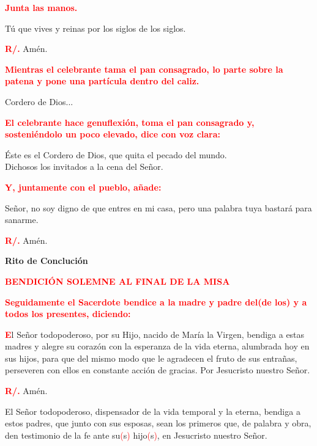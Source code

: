 \documentclass[12pt, letterpaper]{report}
\begin{document}
\large{\bfseries \textcolor{red}{Junta las manos.}}

\Large T\'u que vives y reinas por los siglos de los siglos.

\noindent
\Large {\bfseries \textcolor{red}{R/.}} \hspace{0.5cm} Am\'en.

\large{\bfseries \textcolor{red}{Mientras el celebrante tama el pan consagrado, lo parte sobre la patena y pone una part\'icula dentro del caliz.}}

\Large Cordero de Dios...

\large{\bfseries \textcolor{red}{El celebrante hace genuflexi\'on, toma el pan consagrado y, sosteni\'endolo un poco elevado, dice con voz clara:}}

\Large \'Este es el Cordero de Dios, que quita el pecado del mundo. \\ Dichosos los invitados a la cena del Se\~nor.

\large{\bfseries \textcolor{red}{Y, juntamente con el pueblo, a\~nade:}}

\Large Se\~nor, no soy digno de que entres en mi casa, pero una palabra tuya bastar\'a para sanarme.

\noindent
\Large {\bfseries \textcolor{red}{R/.}} \hspace{0.5cm} Am\'en.


\newpage

\begin{center}
\Huge {\bfseries Rito de Concluci\'on}
\end{center}

\Large {\bfseries \textcolor{red}{BENDICI\'ON SOLEMNE AL FINAL DE LA MISA}}

\large{\bfseries \textcolor{red}{Seguidamente el Sacerdote bendice a la madre y padre del(de los) y a todos los presentes, diciendo:}}

\lettrine[lines=1]{\bfseries \textcolor{red}{E}}{}\Large l Se\~nor todopoderoso, por su Hijo, nacido de Mar\'ia la Virgen, bendiga a estas madres y alegre su coraz\'on con la esperanza de la vida eterna, alumbrada hoy en sus hijos, para que del mismo modo que le agradecen el fruto de sus entra\~nas, perseveren con ellos en constante acci\'on de gracias. Por Jesucristo nuestro Se\~nor.

\noindent
\Large {\bfseries \textcolor{red}{R/.}} \hspace{0.5cm} Am\'en.

\Large El Se\~nor todopoderoso, dispensador de la vida temporal y la eterna, bendiga a estos padres, que junto con sus esposas, sean los primeros que, de palabra y obra, den testimonio de la fe ante su\textcolor{red}{(}s\textcolor{red}{)} hijo\textcolor{red}{(}s\textcolor{red}{)}, en Jesucristo nuestro Se\~nor.
\end{document}
